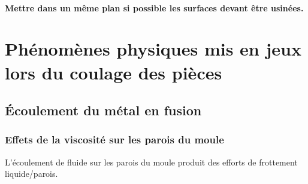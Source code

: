\documentclass[11pt,oneside]{article}
\begin{document}
\paragraph*{Mettre dans un même plan si possible les surfaces devant être
usinées.}


% 

% 
% 
% 


\section{Phénomènes physiques mis en jeux lors du coulage des pièces}
\subsection{Écoulement du métal en fusion}
\subsubsection{Effets de la viscosité sur les parois du moule}
L'écoulement de fluide sur les parois du moule produit des efforts de
frottement liquide/parois.
\end{document}
